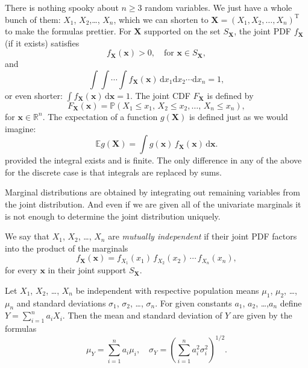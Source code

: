 There is nothing spooky about \(n\geq3\) random variables. We just
have a whole bunch of them: \(X_{1}\), \(X_{2}\),\ldots{}, \(X_{n}\), which
we can shorten to
\(\mathbf{X}=(X_{1},X_{2},\ldots,X_{n})^{\mathrm{T}}\) to make the
formulas prettier.
For \(\mathbf{X}\) supported on the set
\(S_{\mathbf{X}}\), the joint PDF \(f_{\mathbf{X}}\) (if it exists)
satisfies
\begin{equation}
f_{\mathbf{X}}(\mathbf{x})>0,\quad \mbox{for }\mathbf{x}\in S_{\mathbf{X}},
\end{equation}
and
\begin{equation}
\int\!\!\!\int\cdots\int f_{\mathbf{X}}(\mathbf{x})\,\mathrm{d} x_{1}\mathrm{d} x_{2}\cdots\mathrm{d} x_{n}=1,
\end{equation}
or even shorter: \(\int
f_{\mathbf{X}}(\mathbf{x})\,\mathrm{d}\mathbf{x}=1\). The joint CDF
\(F_{\mathbf{X}}\) is defined by
\begin{equation}
F_{\mathbf{X}}(\mathbf{x})=\mathbb{P}(X_{1}\leq x_{1},\, X_{2}\leq x_{2},\ldots,\, X_{n}\leq x_{n}),
\end{equation}
for \(\mathbf{x}\in\mathbb{R}^{n}\). The expectation of a function
\(g(\mathbf{X})\) is defined just as we would imagine:
\begin{equation}
\mathbb{E} g(\mathbf{X})=\int g(\mathbf{x})\, f_{\mathbf{X}}(\mathbf{x})\,\mathrm{d}\mathbf{x}.
\end{equation}
provided the integral exists and is finite.
The only difference in
any of the above for the discrete case is that integrals are replaced
by sums.

Marginal distributions are obtained by integrating out remaining
variables from the joint distribution. And even if we are given all of
the univariate marginals it is not enough to determine the joint
distribution uniquely.

We say that \(X_{1}\), \(X_{2}\), \ldots{}, \(X_{n}\) are \emph{mutually
independent} if their joint PDF factors into the product of the
marginals
\begin{equation}
f_{\mathbf{X}}(\mathbf{x})=f_{X_{1}}(x_{1})\, f_{X_{2}}(x_{2})\,\cdots\, f_{X_{n}}(x_{n}),
\end{equation}
for every \(\mathbf{x}\) in their joint support \(S_{\mathbf{X}}\).

\begin{prop}
\label{pro-mean-sd-lin-comb} Let \(X_{1}\), \(X_{2}\), \ldots{}, \(X_{n}\) be
independent with respective population means \(\mu_{1}\), \(\mu_{2}\),
\ldots{}, \(\mu_{n}\) and standard deviations \(\sigma_{1}\),
\(\sigma_{2}\), \ldots{}, \(\sigma_{n}\). For given constants \(a_{1}\),
\(a_{2}\), \ldots{},\(a_{n}\) define \(Y=\sum_{i=1}^{n}a_{i}X_{i}\). Then
the mean and standard deviation of \(Y\) are given by the formulas
\begin{equation}
\mu_{Y}=\sum_{i=1}^{n}a_{i}\mu_{i},\quad \sigma_{Y}=\left(\sum_{i=1}^{n}a_{i}^{2}\sigma_{i}^{2}\right)^{1/2}.
\end{equation}
\end{prop}

